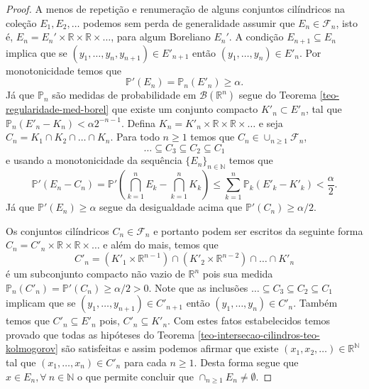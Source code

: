 \begin{proof}
A menos de repetição e renumeração de alguns conjuntos 
cilíndricos na coleção $E_1,E_2,\ldots $ 
podemos sem perda de generalidade assumir que 
$E_n\in\mathcal{F}_n$, isto é, 
$E_n=E_n'\times\mathbb{R}\times\mathbb{R}\times\ldots$,
para algum Boreliano $E_n'$. 
A condição $E_{n+1}\subseteq E_{n}$ implica que se
$(y_1,\ldots, y_n,y_{n+1})\in E'_{n+1}$ então 
$(y_1,\ldots, y_n)\in E'_{n}$. 
Por monotonicidade temos que 
\[
\mathbb{P}'(E_n) = \mathbb{P}_{n}(E'_n)\geq \alpha.
\]
Já que $\mathbb{P}_n$ são medidas de probabilidade em 
$\mathscr{B}(\mathbb{R}^n)$ segue do 
Teorema \ref{teo-regularidade-med-borel} que existe
um conjunto compacto $K'_n\subset E'_n$, tal que 
$\mathbb{P}_{n}(E'_n-K_n)<\alpha 2^{-n-1}$.
Defina $K_n = K'_n\times \mathbb{R}\times\mathbb{R}\times\ldots$
e seja $C_n = K_1\cap K_2\cap\ldots\cap K_n$. Para todo $n\geq 1$ 
temos que $C_n\in \cup_{n\geq 1}\mathcal{F}_n$,  
\[
\ldots\subseteq C_3\subseteq C_2\subseteq C_1
\]
e usando a monotonicidade da sequência $\{E_n\}_{n\in\mathbb{N}}$ 
temos que 
\[
\mathbb{P}'(E_n-C_n)
=
\mathbb{P}'\left( \bigcap_{k=1}^n E_k- \bigcap_{k=1}^n K_k \right)
\leq
\sum_{k=1}^{n} \mathbb{P}_{k}(E'_k-K'_k)
<
\frac{\alpha}{2}.
\]
Já que $\mathbb{P}'(E_n)\geq \alpha$ segue da desigualdade 
acima que $\mathbb{P}'(C_n)\geq \alpha/2$.

Os conjuntos cilíndricos $C_n\in\mathcal{F}_n$ e portanto 
podem ser escritos da seguinte forma
$C_n= C'_n\times\mathbb{R}\times\mathbb{R}\times\ldots$ e 
além do mais, temos que 
\[
C'_n 
= 
(K'_1\times\mathbb{R}^{n-1})
\cap 
(K'_2\times\mathbb{R}^{n-2})
\cap
\ldots
\cap
K'_n
\]
é um subconjunto compacto não vazio de $\mathbb{R}^n$
pois sua medida 
$\mathbb{P}_{n}(C'_n)=\mathbb{P}'(C_n)\geq \alpha/2>0.$
Note que as inclusões $\ldots\subseteq C_3\subseteq C_2\subseteq C_1$
implicam que se $(y_1,\ldots,y_{n+1})\in C'_{n+1}$ 
então $(y_1,\ldots,y_{n})\in C'_n$. 
Também temos que $C'_n\subseteq E'_n$ pois, $C'_n\subseteq K'_n$.
Com estes fatos estabelecidos 
temos provado que todas as hipóteses do 
Teorema \ref{teo-intersecao-cilindros-teo-kolmogorov}
são satisfeitas e assim podemos afirmar que existe 
$(x_1,x_2,\ldots)\in\mathbb{R}^{\mathbb{N}}$ tal que 
$(x_1,\ldots,x_n)\in C'_n$ para cada $n\geq 1$.
Desta forma segue que $x\in E_n, \forall\ n\in\mathbb{N}$
o que permite concluir que $\cap_{n\geq 1} E_n\neq \emptyset$.
\end{proof}